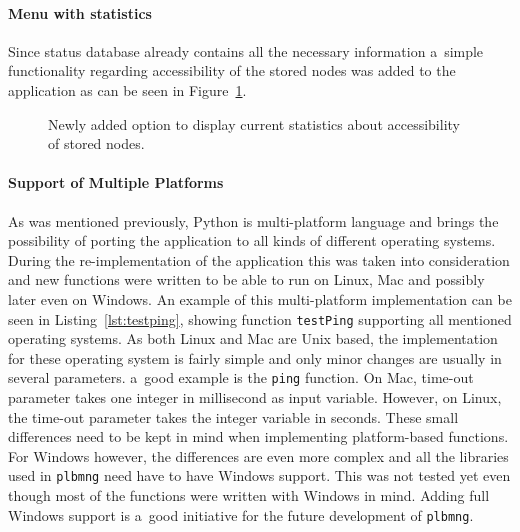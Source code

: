 {{{{{{\paragraph{Menu with statistics}
Since status database already contains all the necessary information a~simple functionality regarding accessibility of the stored nodes was added to the application as can be seen in Figure~\ref{fig:statmenu}. 

\begin{figure}[H]
	\centering
	\caption{Newly added option to display current statistics about accessibility of stored nodes.}
	\label{fig:statmenu}
\end{figure}

\paragraph{Support of Multiple Platforms}
As was mentioned previously, Python is multi-platform language and brings the possibility of porting the application to all kinds of different operating systems. During the re-implementation of the application this was taken into consideration and new functions were written to be able to run on Linux, Mac and possibly later even on Windows. An example of this multi-platform implementation can be seen in Listing~\ref{lst:testping}, showing function \texttt{testPing} supporting all mentioned operating systems. As both Linux and Mac are Unix based, the implementation for these operating system is fairly simple and only minor changes are usually in several parameters. a~good example is the \texttt{ping} function. On Mac, time-out parameter takes one integer in millisecond as input variable. However, on Linux, the time-out parameter takes the integer variable in seconds. These small differences need to be kept in mind when implementing platform-based functions. For Windows however, the differences are even more complex and all the libraries used in \texttt{plbmng} need have to have Windows support. This was not tested yet even though most of the functions were written with Windows in mind. Adding full Windows support is a~good initiative for the future development of \texttt{plbmng}.

}}}}}}
